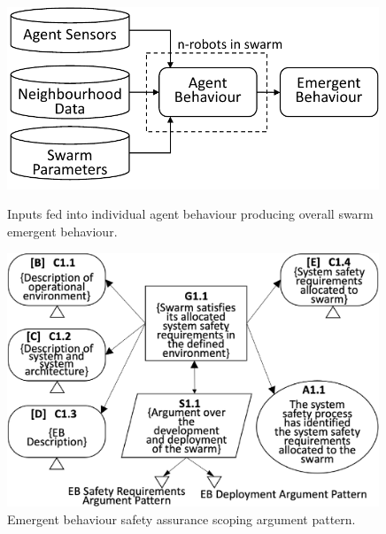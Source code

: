 \documentclass[runningheads]{llncs}
\begin{document}
\begin{figure}[!t]
	\vspace{-1ex}
	\centering
	\begin{minipage}[b]{.45\textwidth}
		\centering
		\includegraphics[width=0.99\textwidth]{figures/stage1-systema-v2.pdf} %
		\caption{Inputs fed into individual agent behaviour producing overall swarm emergent behaviour. }%
		\label{system-description}
	\end{minipage}%
	\hspace*{0.03\textwidth}
	\begin{minipage}[b]{.52\textwidth}
		\centering
		\includegraphics[width=0.99\textwidth]{figures/stage1-argumentpattern-v3.pdf}%
		\vspace{-2ex}
		\caption{Emergent behaviour safety assurance scoping argument pattern.}
		\label{stage1-ap}
	\end{minipage}	
	\vspace{-4ex}
\end{figure}
\end{document}
